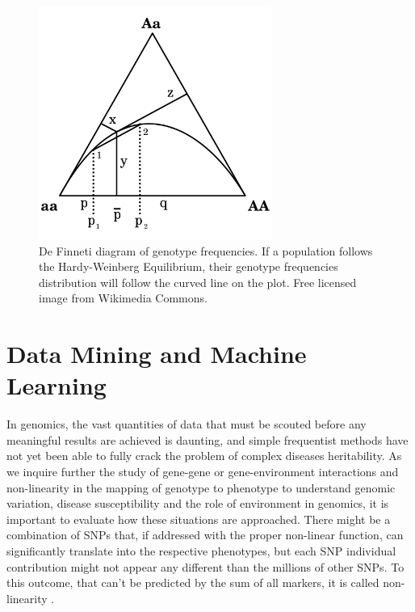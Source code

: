 \begin{figure}[h]
	\centering
	\includegraphics[width=3in]{../images/sota/1024px-De_Finetti_diagram.png}
	\caption{De Finneti diagram of genotype frequencies. If a population follows the Hardy-Weinberg Equilibrium, their genotype frequencies distribution will follow the curved line on the plot. Free licensed image from Wikimedia Commons.} 
	\label{fig:HWE}
\end{figure}


\section{Data Mining and Machine Learning}

In genomics, the vast quantities of data that must be scouted before any meaningful results are achieved is daunting, and simple frequentist methods have not yet been able to fully crack the problem of complex diseases heritability. As we inquire further the study of gene-gene or gene-environment interactions and non-linearity in the mapping of genotype to phenotype to understand genomic variation, disease susceptibility and the role of environment in genomics, it is important to evaluate how these situations are approached. There might be a combination of \gls{SNP}s that, if addressed with the proper non-linear function, can significantly translate into the respective phenotypes, but each \gls{SNP} individual contribution might not appear any different than the millions of other \gls{SNP}s. To this outcome, that can't be predicted by the sum of all markers, it is called non-linearity \cite{moore2010bioinformatics}.

